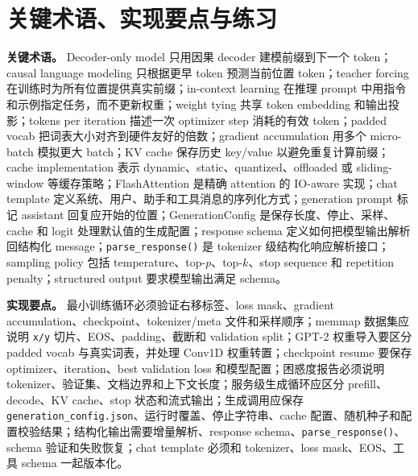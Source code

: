 \documentclass[UTF8,zihao=-4,openany]{ctexbook}
\begin{document}
\section{关键术语、实现要点与练习}
\textbf{关键术语。} Decoder-only model 只用因果 decoder 建模前缀到下一个 token；causal language modeling 只根据更早 token 预测当前位置 token；teacher forcing 在训练时为所有位置提供真实前缀；in-context learning 在推理 prompt 中用指令和示例指定任务，而不更新权重；weight tying 共享 token embedding 和输出投影；tokens per iteration 描述一次 optimizer step 消耗的有效 token；padded vocab 把词表大小对齐到硬件友好的倍数；gradient accumulation 用多个 micro-batch 模拟更大 batch；KV cache 保存历史 key/value 以避免重复计算前缀；cache implementation 表示 dynamic、static、quantized、offloaded 或 sliding-window 等缓存策略；FlashAttention 是精确 attention 的 IO-aware 实现；chat template 定义系统、用户、助手和工具消息的序列化方式；generation prompt 标记 assistant 回复应开始的位置；GenerationConfig 是保存长度、停止、采样、cache 和 logit 处理默认值的生成配置；response schema 定义如何把模型输出解析回结构化 message；\texttt{parse\_response()} 是 tokenizer 级结构化响应解析接口；sampling policy 包括 temperature、top-$p$、top-$k$、stop sequence 和 repetition penalty；structured output 要求模型输出满足 schema。

\textbf{实现要点。} 最小训练循环必须验证右移标签、loss mask、gradient accumulation、checkpoint、tokenizer/meta 文件和采样顺序；memmap 数据集应说明 \texttt{x/y} 切片、EOS、padding、截断和 validation split；GPT-2 权重导入要区分 padded vocab 与真实词表，并处理 Conv1D 权重转置；checkpoint resume 要保存 optimizer、iteration、best validation loss 和模型配置；困惑度报告必须说明 tokenizer、验证集、文档边界和上下文长度；服务级生成循环应区分 prefill、decode、KV cache、stop 状态和流式输出；生成调用应保存 \texttt{generation\_config.json}、运行时覆盖、停止字符串、cache 配置、随机种子和配置校验结果；结构化输出需要增量解析、response schema、\texttt{parse\_response()}、schema 验证和失败恢复；chat template 必须和 tokenizer、loss mask、EOS、工具 schema 一起版本化。
\end{document}

